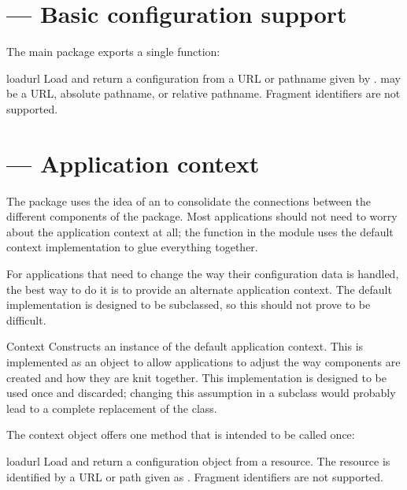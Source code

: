 \documentclass{howto}
\begin{document}
\section{ --- Basic configuration support}


The main  package exports a single function:

\begin{funcdesc}{load}{url}
  Load and return a configuration from a URL or pathname given by
  .   may be a URL, absolute pathname, or relative
  pathname.  Fragment identifiers are not supported.
\end{funcdesc}


\section{ --- Application context}


The  package uses the idea of an  to consolidate the connections between the different
components of the package.  Most applications should not need to worry
about the application context at all; the  function
in the  module uses the default context implementation
to glue everything together.

For applications that need to change the way their configuration data
is handled, the best way to do it is to provide an alternate
application context.  The default implementation is designed to be
subclassed, so this should not prove to be difficult.

\begin{classdesc}{Context}{}
  Constructs an instance of the default application context.  This is
  implemented as an object to allow applications to adjust the way
  components are created and how they are knit together.  This
  implementation is designed to be used once and discarded; changing
  this assumption in a subclass would probably lead to a complete
  replacement of the class.
\end{classdesc}

The context object offers one method that is intended to be called
once:

\begin{methoddesc}{load}{url}
  Load and return a configuration object from a resource.  The
  resource is identified by a URL or path given as .
  Fragment identifiers are not supported.
\end{methoddesc}
\end{document}
